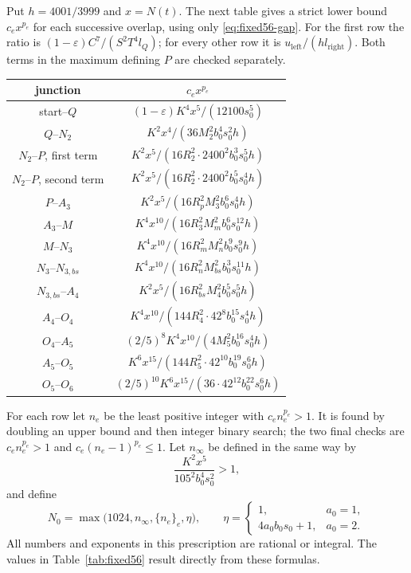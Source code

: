 \documentclass[12pt]{article}
\numberwithin{equation}{section}
\begin{document}
Put $h=4001/3999$ and $x=N(t)$.
The next table gives a strict lower bound $c_ex^{p_e}$ for each
successive overlap, using only \eqref{eq:fixed56-gap}.
For the first row the ratio is $(1-\varepsilon)C^7/(S^2T^4l_Q)$;
for every other row it is $u_{\mathrm{left}}/(hl_{\mathrm{right}})$.
Both terms in the maximum defining $P$ are checked separately.
\begin{center}\small
\begin{tabular}{c|c}
junction&$c_ex^{p_e}$\\\hline
start--$Q$&$(1-\varepsilon)K^4x^5/(12100s_0^5)$\\
$Q$--$N_2$&$K^2x^4/(36M_2^2b_0^4s_0^2h)$\\
$N_2$--$P$, first term&$K^2x^5/(16R_2^2\cdot2400^2b_0^3s_0^5h)$\\
$N_2$--$P$, second term&$K^2x^5/(16R_2^2\cdot2400^2b_0^5s_0^4h)$\\
$P$--$A_3$&$K^2x^5/(16R_p^2M_3^2b_0^6s_0^4h)$\\
$A_3$--$M$&$K^4x^{10}/(16R_3^2M_m^2b_0^6s_0^{12}h)$\\
$M$--$N_3$&$K^4x^{10}/(16R_m^2M_n^2b_0^9s_0^9h)$\\
$N_3$--$N_{3,bs}$&$K^4x^{10}/(16R_n^2M_{bs}^2b_0^3s_0^{11}h)$\\
$N_{3,bs}$--$A_4$&$K^2x^5/(16R_{bs}^2M_4^2b_0^5s_0^5h)$\\
$A_4$--$O_4$&$K^4x^{10}/(144R_4^2\cdot42^8b_0^{15}s_0^4h)$\\
$O_4$--$A_5$&$(2/5)^8K^4x^{10}/(4M_5^2b_0^{16}s_0^4h)$\\
$A_5$--$O_5$&$K^6x^{15}/(144R_5^2\cdot42^{10}b_0^{19}s_0^6h)$\\
$O_5$--$O_6$&$(2/5)^{10}K^6x^{15}/(36\cdot42^{12}b_0^{22}s_0^6h)$
\end{tabular}
\end{center}
For each row let $n_e$ be the least positive integer with $c_en_e^{p_e}>1$.
It is found by doubling an upper bound and then integer binary search;
the two final checks are $c_en_e^{p_e}>1$ and
$c_e(n_e-1)^{p_e}\le1$.
Let $n_\infty$ be defined in the same way by
\[
 \frac{K^2x^5}{105^2b_0^4s_0^2}>1,
\]
and define
\begin{equation}\label{eq:fixed56-cutoff}
 N_0=\max\bigl(1024,n_\infty,\{n_e\}_e,\eta\bigr),\qquad
 \eta=\begin{cases}1,&a_0=1,\\4a_0b_0s_0+1,&a_0=2.\end{cases}
\end{equation}
All numbers and exponents in this prescription are rational or integral.
The values in Table~\ref{tab:fixed56} result directly from these formulas.
\end{document}
